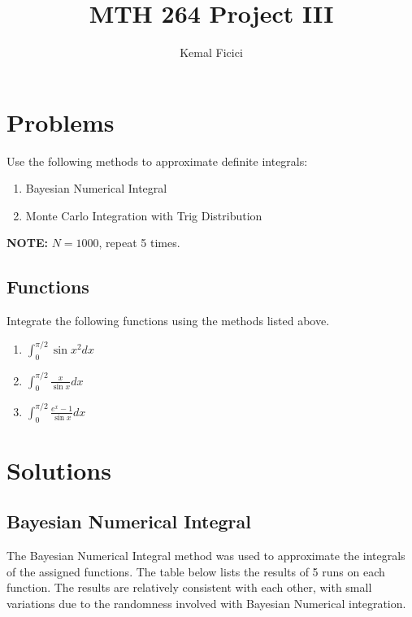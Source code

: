 \documentclass[a4paper12pt,titlepage]{article}
\title{\textbf{MTH 264 Project III}}
\author{Kemal Ficici}
\begin{document}
\maketitle

\clearpage


\section{Problems}

Use the following methods to approximate definite integrals:
    \begin{enumerate}
        \item Bayesian Numerical Integral
        \item Monte Carlo Integration with Trig Distribution
    \end{enumerate}
\textbf{NOTE: } $N = 1000$, repeat 5 times.

\subsection{Functions}
    Integrate the following functions using the methods listed above.
    \LARGE{
        \begin{enumerate}[label=\roman*.]

            \item $\int_{0}^{\pi/2} \sin{x^2} dx$
            \item $\int_{0}^{\pi/2} \frac{x}{\sin{x}} dx$
            \item $\int_{0}^{\pi/2} \frac{e^x -1}{\sin{x}} dx$
        \end{enumerate}
    }
\clearpage

\section{Solutions}
    \subsection{Bayesian Numerical Integral}
        \normalsize{The Bayesian Numerical Integral method was used to approximate the integrals of the assigned functions. The table below lists the results of 5 runs on each function. The results are relatively consistent with each other, with small variations due to the randomness involved with Bayesian Numerical integration.}
\end{document}
